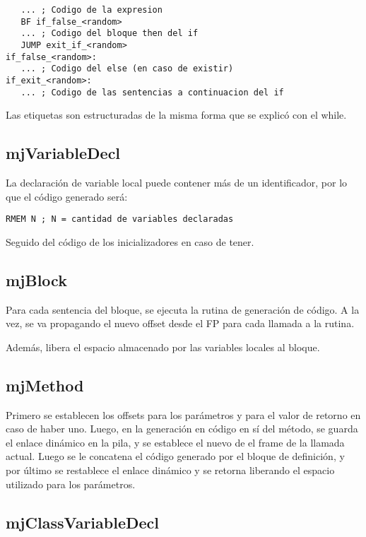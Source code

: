 \documentclass [a4paper,abstracton,titlepage]{scrartcl}
\begin{document}
  \begin{lstlisting}
   ... ; Codigo de la expresion
   BF if_false_<random>
   ... ; Codigo del bloque then del if
   JUMP exit_if_<random>
if_false_<random>:
   ... ; Codigo del else (en caso de existir)
if_exit_<random>:
   ... ; Codigo de las sentencias a continuacion del if
  \end{lstlisting}

Las etiquetas son estructuradas de la misma forma que se explicó con el while.

  \subsection{mjVariableDecl}

La declaración de variable local puede contener más de un identificador, por lo
que el código generado será:

  \begin{lstlisting}
RMEM N ; N = cantidad de variables declaradas
  \end{lstlisting}

Seguido del código de los inicializadores en caso de tener.

  \subsection{mjBlock}

Para cada sentencia del bloque, se ejecuta la rutina de generación de código. A
la vez, se va propagando el nuevo offset desde el FP para cada llamada a la
rutina.

Además, libera el espacio almacenado por las variables locales al bloque.

  \subsection{mjMethod}

Primero se establecen los offsets para los parámetros y para el valor de retorno en caso de haber uno. Luego, en la generación en código en sí del método, se guarda el enlace dinámico en la pila, y se establece el nuevo de el frame de la llamada actual. Luego se le concatena el código generado por el bloque de definición, y por último se restablece el enlace dinámico y se retorna liberando el espacio utilizado para los parámetros.

  \subsection{mjClassVariableDecl}
\end{document}
